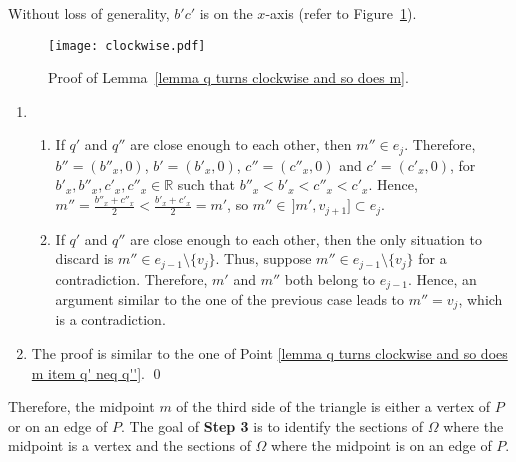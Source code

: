 \documentclass[11pt, oneside]{article}
\begin{document}
\proof Without loss of generality,
$b'c'$ is on the $x$-axis
(refer to Figure~\ref{figure clockwise}).
\begin{figure}
\centering
\texttt{[image: clockwise.pdf]}
\caption{Proof of Lemma~\ref{lemma q turns clockwise and so does m}.\label{figure clockwise}}
\end{figure}
\begin{enumerate}
\item
\begin{enumerate}
\item
If $q'$ and $q''$ are close enough to each other,
then $m'' \in e_j$.
Therefore,
$b''=(b''_x,0)$,
$b'=(b'_x,0)$,
$c''=(c''_x,0)$
and $c'=(c'_x,0)$,
for $b'_x,b''_x,c'_x,c''_x \in \mathbb{R}$
such that $b''_x < b'_x < c''_x < c'_x$.
Hence,
$m''=\frac{b''_x+c''_x}{2}<\frac{b'_x+c'_x}{2}=m'$,
so $m'' \in\, ]m',v_{j+1}]\subset e_j$.

\item
If $q'$ and $q''$ are close enough to each other,
then the only situation to discard is $m''\in e_{j-1}\setminus\{v_j\}$.
Thus,
suppose $m''\in e_{j-1}\setminus\{v_j\}$ for a contradiction.
Therefore,
$m'$ and $m''$ both belong to $e_{j-1}$.
Hence,
an argument similar to the one of the previous case leads to $m''=v_j$, 
which is a contradiction.
\end{enumerate}

\item The proof is similar to the one of Point \ref{lemma q turns clockwise and so does m item q' neq q''}.
\qed
\end{enumerate}

Therefore,
the midpoint $m$ of the third side of the triangle
is either a vertex of $P$
or on an edge of $P$.
The goal of {\bf Step 3} is to identify 
the sections of $\Omega$
where the midpoint is a vertex
and the sections of $\Omega$
where the midpoint is on an edge of $P$.
\end{document}
